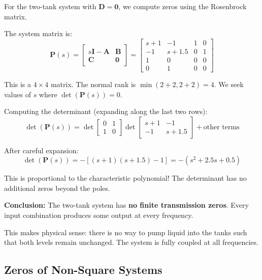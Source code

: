 \begin{example}
\label{ex:two_tank_zeros}
For the two-tank system with $\mathbf{D} = \mathbf{0}$, we compute zeros using the Rosenbrock matrix.

The system matrix is:
\begin{equation}
\mathbf{P}(s) = \begin{bmatrix} s\mathbf{I} - \mathbf{A} & \mathbf{B} \\ \mathbf{C} & \mathbf{0} \end{bmatrix} = \begin{bmatrix} s+1 & -1 & 1 & 0 \\ -1 & s+1.5 & 0 & 1 \\ 1 & 0 & 0 & 0 \\ 0 & 1 & 0 & 0 \end{bmatrix}
\end{equation}

This is a $4 \times 4$ matrix. The normal rank is $\min(2+2, 2+2) = 4$. We seek values of $s$ where $\det(\mathbf{P}(s)) = 0$.

Computing the determinant (expanding along the last two rows):
\begin{equation}
\det(\mathbf{P}(s)) = \det\begin{bmatrix} 0 & 1 \\ 1 & 0 \end{bmatrix} \det\begin{bmatrix} s+1 & -1 \\ -1 & s+1.5 \end{bmatrix} + \text{other terms}
\end{equation}

After careful expansion:
\begin{equation}
\det(\mathbf{P}(s)) = -[(s+1)(s+1.5) - 1] = -(s^2 + 2.5s + 0.5)
\end{equation}

This is proportional to the characteristic polynomial! The determinant has no additional zeros beyond the poles.

\textbf{Conclusion:} The two-tank system has \textbf{no finite transmission zeros}. Every input combination produces some output at every frequency.

This makes physical sense: there is no way to pump liquid into the tanks such that both levels remain unchanged. The system is fully coupled at all frequencies.
\end{example}

\subsection{Zeros of Non-Square Systems}

